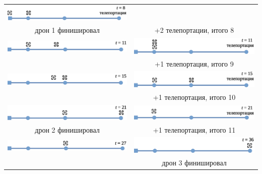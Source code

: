 \begin{center}
\begin{tabular}{cc}
\includegraphics[scale=0.5]{sample-3-09.eps}\\
дрон 1 финишировал &+2 телепортации, итого 8\\[0.5cm]
\includegraphics[scale=0.5]{sample-3-10.eps}&
\includegraphics[scale=0.5]{sample-3-11.eps}\\
&+1 телепортация, итого 9\\[0.5cm]
\includegraphics[scale=0.5]{sample-3-12.eps}&
\includegraphics[scale=0.5]{sample-3-13.eps}\\
&+1 телепортация, итого 10\\[0.5cm]
\includegraphics[scale=0.5]{sample-3-14.eps}&
\includegraphics[scale=0.5]{sample-3-15.eps}\\
дрон 2 финишировал&+1 телепортация, итого 11\\[0.5cm]
\includegraphics[scale=0.5]{sample-3-16.eps}&
\includegraphics[scale=0.5]{sample-3-17.eps}\\
&дрон 3 финишировал\\
\end{tabular}
\end{center}


